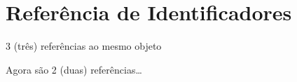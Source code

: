 \documentclass[letterpaper,10pt,brazil]{sphinxmanual}
\begin{document}
\begin{sphinxVerbatim}[commandchars=\\\{\}]
\end{sphinxVerbatim}


\section{Referência de Identificadores}
\label{\detokenize{content/language_particularities:referencia-de-identificadores}}
\begin{sphinxVerbatim}[commandchars=\\\{\}]
  
  
  

\end{sphinxVerbatim}

\begin{sphinxVerbatim}[commandchars=\\\{\}]
\end{sphinxVerbatim}

\begin{sphinxVerbatim}[commandchars=\\\{\}]
\end{sphinxVerbatim}

\begin{sphinxVerbatim}[commandchars=\\\{\}]
\end{sphinxVerbatim}

\begin{sphinxVerbatim}[commandchars=\\\{\}]
\end{sphinxVerbatim}

\begin{sphinxVerbatim}[commandchars=\\\{\}]
\end{sphinxVerbatim}

3 (três) referências ao mesmo objeto

\begin{sphinxVerbatim}[commandchars=\\\{\}]
 
\end{sphinxVerbatim}

Agora são 2 (duas) referências…
\end{document}
